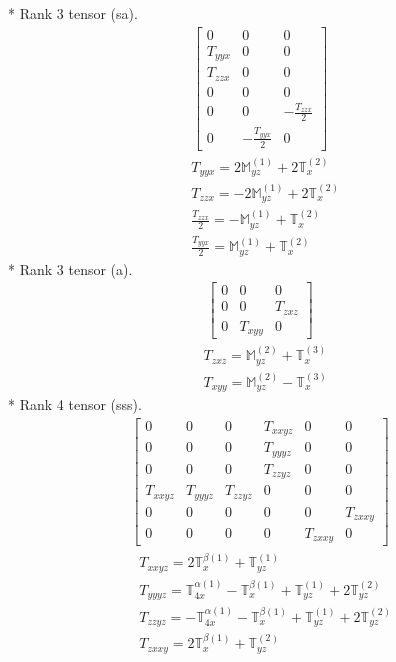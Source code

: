 \documentclass[fleqn,8pt,landscape]{jsarticle}
\begin{document}
* Rank 3 tensor (sa).
\begin{align*}
\begin{bmatrix} 0 & 0 & 0 \\ T_{yyx} & 0 & 0 \\ T_{zzx} & 0 & 0 \\ 0 & 0 & 0 \\ 0 & 0 & - \frac{T_{zzx}}{2} \\ 0 & - \frac{T_{yyx}}{2} & 0 \end{bmatrix}
\end{align*}
\begin{align*}
& T_{yyx} = 2 \mathbb{M}_{yz}^{(1)} + 2 \mathbb{T}_{x}^{(2)} \\
& T_{zzx} = - 2 \mathbb{M}_{yz}^{(1)} + 2 \mathbb{T}_{x}^{(2)} \\
& \frac{T_{zzx}}{2} = - \mathbb{M}_{yz}^{(1)} + \mathbb{T}_{x}^{(2)} \\
& \frac{T_{yyx}}{2} = \mathbb{M}_{yz}^{(1)} + \mathbb{T}_{x}^{(2)}
\end{align*}
* Rank 3 tensor (a).
\begin{align*}
\begin{bmatrix} 0 & 0 & 0 \\ 0 & 0 & T_{zxz} \\ 0 & T_{xyy} & 0 \end{bmatrix}
\end{align*}
\begin{align*}
& T_{zxz} = \mathbb{M}_{yz}^{(2)} + \mathbb{T}_{x}^{(3)} \\
& T_{xyy} = \mathbb{M}_{yz}^{(2)} - \mathbb{T}_{x}^{(3)}
\end{align*}
* Rank 4 tensor (sss).
\begin{align*}
\begin{bmatrix} 0 & 0 & 0 & T_{xxyz} & 0 & 0 \\ 0 & 0 & 0 & T_{yyyz} & 0 & 0 \\ 0 & 0 & 0 & T_{zzyz} & 0 & 0 \\ T_{xxyz} & T_{yyyz} & T_{zzyz} & 0 & 0 & 0 \\ 0 & 0 & 0 & 0 & 0 & T_{zxxy} \\ 0 & 0 & 0 & 0 & T_{zxxy} & 0 \end{bmatrix}
\end{align*}
\begin{align*}
& T_{xxyz} = 2 \mathbb{T}_{x}^{\beta(1)} + \mathbb{T}_{yz}^{(1)} \\
& T_{yyyz} = \mathbb{T}_{4x}^{\alpha(1)} - \mathbb{T}_{x}^{\beta(1)} + \mathbb{T}_{yz}^{(1)} + 2 \mathbb{T}_{yz}^{(2)} \\
& T_{zzyz} = - \mathbb{T}_{4x}^{\alpha(1)} - \mathbb{T}_{x}^{\beta(1)} + \mathbb{T}_{yz}^{(1)} + 2 \mathbb{T}_{yz}^{(2)} \\
& T_{zxxy} = 2 \mathbb{T}_{x}^{\beta(1)} + \mathbb{T}_{yz}^{(2)}
\end{align*}
\end{document}

